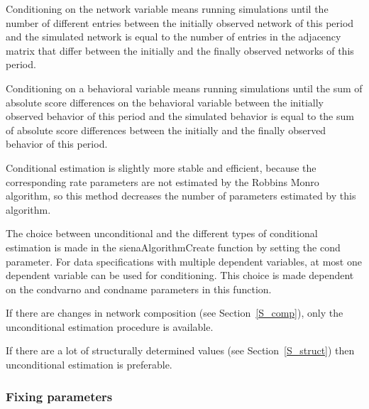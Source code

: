 \documentclass[a4paper,fleqn,11pt]{article}
\newcommand{\+}{\, + \,}
\begin{document}
Conditioning on the network variable means running simulations
until the number of different entries between the initially
observed network of this period and the simulated network
\hypertarget{T_distance_stop}{is equal to the number} of entries
in the adjacency matrix that differ between the initially and the
finally observed networks of this period.

Conditioning on a behavioral variable means running simulations
until the sum of absolute score differences on the behavioral
variable between the initially observed behavior of this period
and the simulated behavior is equal to the sum of absolute score
differences between the initially and the finally observed
behavior of this period.

Conditional estimation is slightly more stable and efficient,
because the corresponding rate parameters are not estimated by the
Robbins Monro algorithm, so this method decreases the number of
parameters estimated by this algorithm.
\medskip

The choice between
unconditional and the different types of conditional estimation is
made in the \textsf{sienaAlgorithmCreate} function by setting the
\textsf{cond} parameter.
For data specifications with multiple dependent variables,
at most one dependent variable can be used for conditioning.
This choice is made dependent on the
\textsf{condvarno} and \textsf{condname} parameters in this function.

If there are changes in network composition (see
Section~\ref{S_comp}), only the unconditional estimation procedure
is available.

If there are a lot of structurally determined values (see Section~\ref{S_struct})
then unconditional estimation is preferable.


\subsubsection{Fixing parameters}
\label{S_fixingparameters}
\end{document}
